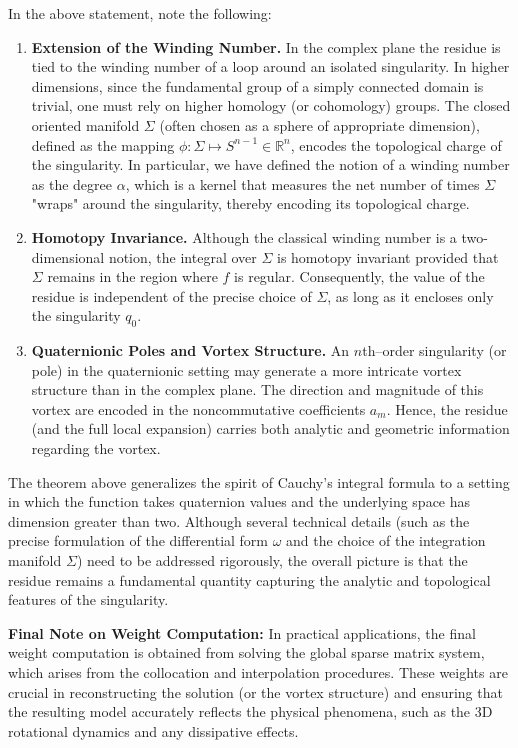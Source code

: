 \documentclass[12pt]{article}
\begin{document}
\begin{remark}
  In the above statement, note the following:
  \begin{enumerate}[label=(\roman*)]
      \item \textbf{Extension of the Winding Number.} In the complex plane the residue is tied to the winding number of a loop around an isolated singularity. In higher dimensions, since the fundamental group of a simply connected domain is trivial, one must rely on higher homology (or cohomology) groups. The closed oriented manifold \(\Sigma\) (often chosen as a sphere of appropriate dimension), defined as the mapping $\phi: \Sigma \mapsto S^{n-1} \in \mathbb{R}^{n}$, encodes the topological charge of the singularity. In particular, we have defined the notion of a winding number as the degree $\alpha$, which is a kernel that measures the net number of times $\Sigma$ "wraps" around the singularity, thereby encoding its topological charge. 
      \item \textbf{Homotopy Invariance.} Although the classical winding number is a two-dimensional notion, the integral over \(\Sigma\) is homotopy invariant provided that \(\Sigma\) remains in the region where \(f\) is regular. Consequently, the value of the residue is independent of the precise choice of \(\Sigma\), as long as it encloses only the singularity \(q_0\).
      \item \textbf{Quaternionic Poles and Vortex Structure.} An \(n\)th–order singularity (or pole) in the quaternionic setting may generate a more intricate vortex structure than in the complex plane. The direction and magnitude of this vortex are encoded in the noncommutative coefficients \(a_m\). Hence, the residue (and the full local expansion) carries both analytic and geometric information regarding the vortex.
  \end{enumerate}
\end{remark}

The theorem above generalizes the spirit of Cauchy’s integral formula to a setting in which the function takes quaternion values and the underlying space has dimension greater than two. Although several technical details (such as the precise formulation of the differential form \(\omega\) and the choice of the integration manifold \(\Sigma\)) need to be addressed rigorously, the overall picture is that the residue remains a fundamental quantity capturing the analytic and topological features of the singularity.

\vspace{1em}
\noindent\textbf{Final Note on Weight Computation:}  
In practical applications, the final weight computation is obtained from solving the global sparse matrix system, which arises from the collocation and interpolation procedures. These weights are crucial in reconstructing the solution (or the vortex structure) and ensuring that the resulting model accurately reflects the physical phenomena, such as the 3D rotational dynamics and any dissipative effects.
\end{document}
